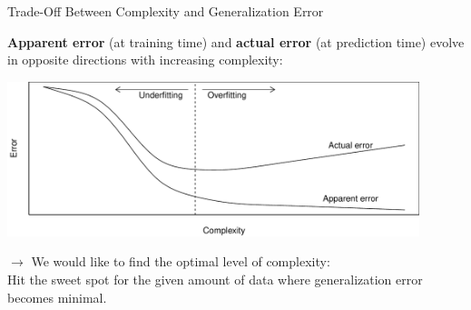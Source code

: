 \begin{vbframe}{Trade-Off Between Complexity and Generalization Error}

\textbf{Apparent error} (at training time) and \textbf{actual error} 
(at prediction time) evolve in opposite directions with increasing 
complexity:

\lz

\begin{knitrout}\scriptsize
{}\color{fgcolor}

{\centering \includegraphics[width = 0.9\textwidth]{figure/eval_ofit_3} 
}
\end{knitrout}

\vfill

$\rightarrow$ We would like to find the optimal level of complexity: \\ 
Hit the sweet spot  for the given amount of data where generalization error 
becomes minimal.

\end{vbframe}


\endlecture

